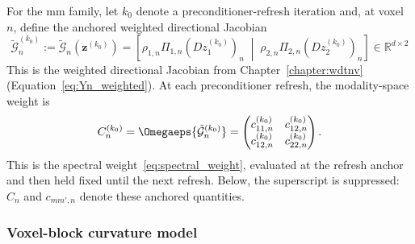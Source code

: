 For the \gls{mm} family, let $k_0$ denote a preconditioner-refresh iteration and, at voxel $n$, define the anchored weighted directional Jacobian
\begin{equation}
    \tilde{\mathcal{G}}_n^{(k_0)}
    :=
    \tilde{\mathcal{G}}_n\!\left(\bm z^{(k_0)}\right)
    =
    \left[
        \rho_{1,n}\Pi_{1,n}(Dz_1^{(k_0)})_n
        \;\middle|\;
        \rho_{2,n}\Pi_{2,n}(Dz_2^{(k_0)})_n
    \right]\in\mathbb{R}^{d\times2}
    \label{eq:optimisation_weighted_jacobian}
\end{equation}
This is the weighted directional Jacobian from Chapter~\ref{chapter:wdtnv} (Equation~\eqref{eq:Yn_weighted}). At each preconditioner refresh, the modality-space  weight is
\begin{equation}
    C_n^{(k_0)}
    =
    \Omegaeps{\tilde{\mathcal{G}}_n^{(k_0)}}
    =
    \begin{pmatrix}
        c_{11,n}^{(k_0)} & c_{12,n}^{(k_0)}\\
        c_{12,n}^{(k_0)} & c_{22,n}^{(k_0)}
    \end{pmatrix}.
    \label{eq:mm_weight_current_code}
\end{equation}
This is the spectral weight~\eqref{eq:spectral_weight}, evaluated at the refresh anchor and then held fixed until the next refresh. Below, the superscript is suppressed: $C_n$ and $c_{mm',n}$ denote these anchored quantities.

\subsubsection{Voxel-block curvature model}
\label{subsubsec:block_curvature_model}

